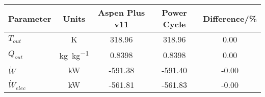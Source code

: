 \begin{tabular}{|p{2.5cm} c c c c|}
    \hline
    \rowcolor{bluepoli!40} %
    \textbf{Parameter} & \textbf{Units} & \textbf{Aspen Plus v11} & \textbf{Power Cycle} & \textbf{Difference/\unit{\percent}} \T\B \\
    \hline \hline
    \(T_{out}\) & \unit{\K} & 318.96 & 318.96 & 0.00 \T\B\\
    \(Q_{out}\) & \unit{\kg\per\kg} & 0.8398 & 0.8398 & 0.00 \T\B\\
    \(\Dot{W}\) & \unit{\kilo\watt} & -591.38 & -591.40 & -0.00 \T\B\\
    \(\Dot{W}_{elec}\) & \unit{\kilo\watt} & -561.81 & -561.83 & -0.00 \T\B\\
    \hline
\end{tabular}